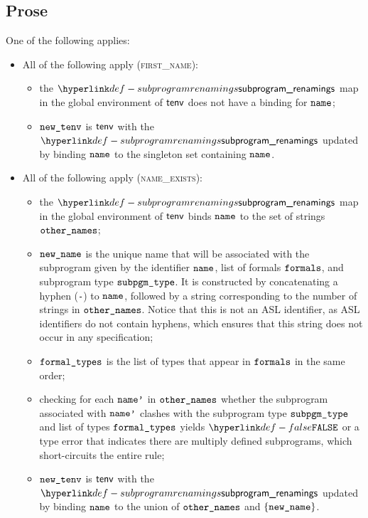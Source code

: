 \subsection{Prose}
One of the following applies:
\begin{itemize}
  \item All of the following apply (\textsc{first\_name}):
  \begin{itemize}
    \item the $\subprogramrenamings$ map in the global environment of $\textsf{tenv}$ does not have a binding for $\texttt{name}$;
    \item $\texttt{new\_tenv}$ is $\textsf{tenv}$ with the $\subprogramrenamings$ updated by binding $\texttt{name}$ to the singleton set containing
          $\texttt{name}$.
  \end{itemize}

  \item All of the following apply (\textsc{name\_exists}):
  \begin{itemize}
    \item the $\subprogramrenamings$ map in the global environment of $\textsf{tenv}$ binds $\texttt{name}$ to the set of strings $\texttt{other\_names}$;
    \item $\texttt{new\_name}$ is the unique name that will be associated with the subprogram given by the identifier $\texttt{name}$, list of formals $\texttt{formals}$,
          and subprogram type $\texttt{subpgm\_type}$. It is constructed by concatenating a hyphen (\texttt{-}) to $\texttt{name}$, followed
          by a string corresponding to the number of strings in $\texttt{other\_names}$.
          Notice that this is not an ASL identifier, as ASL identifiers do not contain hyphens, which ensures that this string
          does not occur in any specification;
    \item $\texttt{formal\_types}$ is the list of types that appear in $\texttt{formals}$ in the same order;
    \item checking for each $\texttt{name'}$ in $\texttt{other\_names}$ whether the subprogram associated with $\texttt{name'}$ clashes
          with the subprogram type $\texttt{subpgm\_type}$ and list of types $\texttt{formal\_types}$ yields $\False$
          or a type error that indicates there are multiply defined subprograms, which short-circuits the entire rule;
    \item $\texttt{new\_tenv}$ is $\textsf{tenv}$ with the $\subprogramrenamings$ updated by binding $\texttt{name}$ to the union of $\texttt{other\_names}$ and
          $\{\texttt{new\_name}\}$.
  \end{itemize}
\end{itemize}


